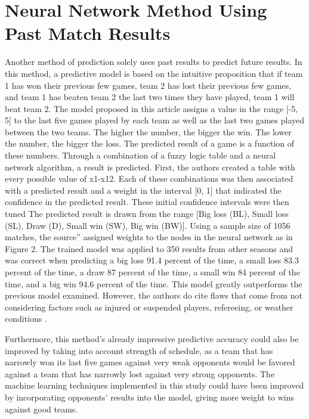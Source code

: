 \documentclass[sigconf]{acmart}
\begin{document}
\section{Neural Network Method Using Past Match Results}
Another method of prediction solely uses past results to predict future results. In this method, a predictive model is based on the intuitive proposition that if team 1 has won their previous few games, team 2 has lost their previous few games, and team 1 has beaten team 2 the last two times they have played, team 1 will beat team 2\cite{FuzzyModel}. The model proposed in this article assigns a value in the range [-5, 5] to the last five games played by each team as well as the last two games played between the two teams. The higher the number, the bigger the win. The lower the number, the bigger the loss. The predicted result of a game is a function of these numbers. Through a combination of a fuzzy logic table and a neural network algorithm, a result is predicted. First, the authors created a table with every possible value of x1-x12. Each of these combinations was then associated with a predicted result and a weight in the interval [0, 1] that indicated the confidence in the predicted result. These initial confidence intervals were then tuned  The predicted result is drawn from the range [Big loss (BL), Small loss (SL), Draw (D), Small win (SW), Big win (BW)]\cite{FuzzyModel}. Using a sample size of 1056 matches, the source'' assigned weights to the nodes in the neural network as in Figure 2. The trained model was applied to 350 results from other seasons and was correct when predicting a big loss 91.4 percent of the time, a small loss 83.3 percent of the time, a draw 87 percent of the time, a small win 84 percent of the time, and a big win 94.6 percent of the time\cite{FuzzyModel}. This model greatly outperforms the previous model examined. However, the authors do cite flaws that come from not considering factors such as injured or suspended players, refereeing, or weather conditions \cite{FuzzyModel}.

Furthermore, this method's already impressive predictive accuracy could also be improved by taking into account strength of schedule, as a team that has narrowly won its last five games against very weak opponents would be favored against a team that has narrowly lost against very strong opponents. The machine learning techniques implemented in this study could have been improved by incorporating opponents' results into the model, giving more weight to wins against good teams.
\end{document}
